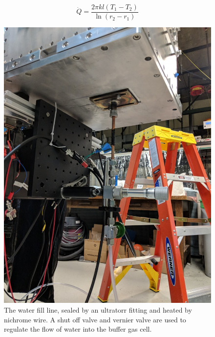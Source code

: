 \begin{equation}
	\dot{Q} = \frac{2 \pi k l (T_1 - T_2)}{\ln(r_2 - r_1)}
	\label{eq: cylindrical fourier}
\end{equation}

\begin{figure}[H]
	\centering
	\includegraphics[width=.7\textwidth]{images/CBGB_water_fill_outside.jpg}
	\caption{The water fill line, sealed by an ultratorr fitting and heated by nichrome wire. A shut off valve and vernier valve are used to regulate the flow of water into the buffer gas cell.}
	\label{fig: water fill bottom}
\end{figure}

